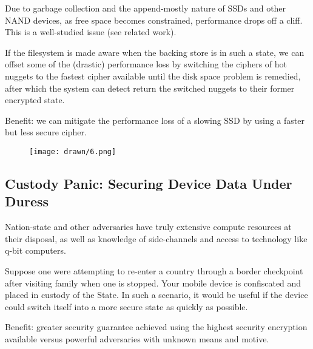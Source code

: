 Due to garbage collection and the append-mostly nature of SSDs and other NAND
devices, as free space becomes constrained, performance drops off a cliff. This
is a well-studied issue (see related work).

If the filesystem is made aware when the backing store is in such a state, we
can offset some of the (drastic) performance loss by switching the ciphers of hot
nuggets to the fastest cipher available until the disk space problem is
remedied, after which the system can detect return the switched nuggets to their
former encrypted state.

Benefit: we can mitigate the performance loss of a slowing SSD by using a faster
but less secure cipher.

\begin{figure}[ht]
 \centering
  \texttt{[image: drawn/6.png]}
   \caption{}\label{fig:eol}
\end{figure}

\subsection{Custody Panic: Securing Device Data Under Duress}

Nation-state and other adversaries have truly extensive compute resources at
their disposal, as well as knowledge of side-channels and access to technology
like q-bit computers.

Suppose one were attempting to re-enter a country through a border checkpoint
after visiting family when one is stopped. Your mobile device is confiscated and
placed in custody of the State. In such a scenario, it would be useful if the
device could switch itself into a more secure state as quickly as possible.

Benefit: greater security guarantee achieved using the highest security
encryption available versus powerful adversaries with unknown means and motive.



